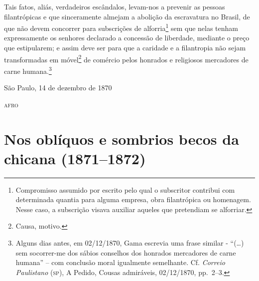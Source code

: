 Tais fatos, aliás, verdadeiros escândalos, levam-nos a prevenir as
pessoas filantrópicas e que sinceramente almejam a abolição da
escravatura no Brasil, de que não devem concorrer para subscrições de
alforria\footnote{ Compromisso assumido por escrito pelo qual o
  subscritor contribui com determinada quantia para alguma empresa, obra
  filantrópica ou homenagem. Nesse caso, a subscrição visava auxiliar
  aqueles que pretendiam se alforriar.} sem que nelas tenham
expressamente os senhores declarado a concessão de liberdade, mediante o
preço que estipularem; e assim deve ser para que a caridade e a
filantropia não sejam transformadas em móvel\footnote{ Causa, motivo.}
de comércio pelos honrados e religiosos mercadores de carne
humana.\footnote{ Alguns dias antes, em 02/12/1870, Gama escrevia uma
  frase similar - ``(\ldots{}) sem socorrer-me dos sábios conselhos dos
  honrados mercadores de carne humana'' -- com conclusão moral igualmente
  semelhante. Cf. \emph{Correio Paulistano} (\textsc{sp}), A Pedido, Cousas
  admiráveis, 02/12/1870, pp.~2--3.}

\begin{flushright}
São Paulo, 14 de dezembro de 1870

\textsc{afro}
\end{flushright}

\part{Nos oblíquos e sombrios becos da chicana (1871--1872)}

